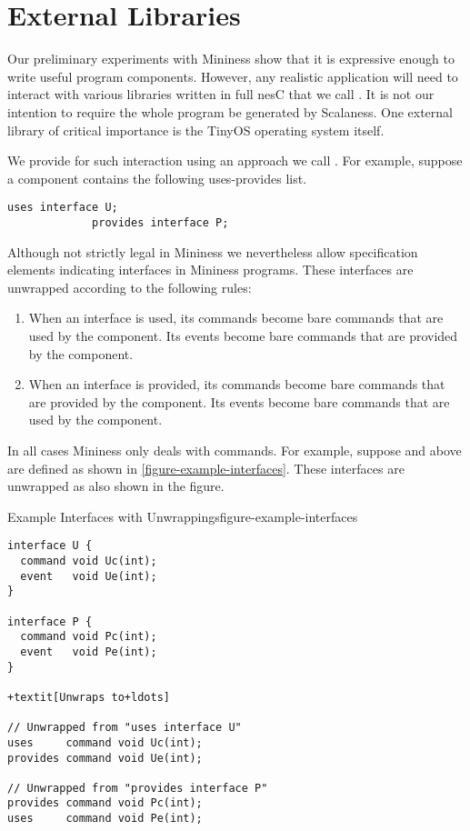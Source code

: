 
\section{External Libraries}
\label{section-external-libraries}

Our preliminary experiments with Mininess show that it is expressive
enough to write useful program components. However, any realistic
application will need to interact with various libraries written in
full nesC that we call . It is not our
intention to require the whole program be generated by Scalaness. One
external library of critical importance is the TinyOS operating system
itself.

We provide for such interaction using an approach we call
. For example, suppose a component
contains the following uses-provides list. \vspace{1.0ex}
\begin{Verbatim}[fontsize=\small]
             uses interface U;
             provides interface P;
\end{Verbatim}
\vspace{1.0ex}

Although not strictly legal in Mininess we nevertheless allow
specification elements indicating interfaces in Mininess programs.
These interfaces are unwrapped according to the following rules:
\begin{enumerate}
\item When an interface is used, its commands become bare commands
  that are used by the component. Its events become bare commands that
  are provided by the component.
\item When an interface is provided, its commands become bare commands
  that are provided by the component. Its events become bare commands
  that are used by the component.
\end{enumerate}

In all cases Mininess only deals with commands. For example, suppose
 and  above are defined as shown in
\autoref{figure-example-interfaces}. These interfaces are unwrapped as
also shown in the figure.

\begin{fpfig}[tbhp]{Example Interfaces with Unwrappings}{figure-example-interfaces}
{
\begin{Verbatim}[commandchars=+\[\], fontsize=\small]
interface U {
  command void Uc(int);
  event   void Ue(int);
}

interface P {
  command void Pc(int);
  event   void Pe(int);
}

+textit[Unwraps to+ldots]

// Unwrapped from "uses interface U"
uses     command void Uc(int);
provides command void Ue(int);

// Unwrapped from "provides interface P"
provides command void Pc(int);
uses     command void Pe(int);
\end{Verbatim}
}
\end{fpfig}

